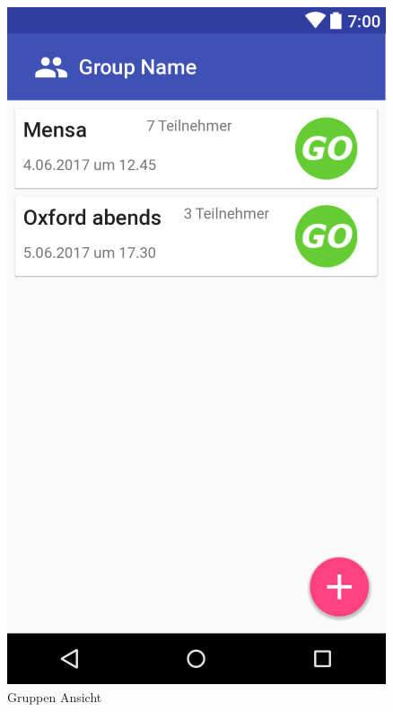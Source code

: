\documentclass[parskip=full]{scrartcl}
\begin{document}
\begin{figure}[H]
	\centering
	\includegraphics[width=.7\textwidth]{GUI/AndroidStudio/group_view.PNG}
	\caption{Gruppen Ansicht}	
\end{figure}
\end{document}
